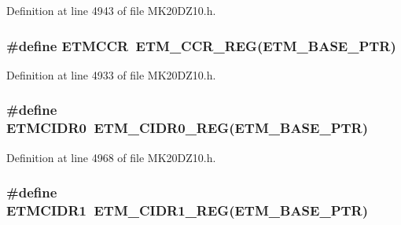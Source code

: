 Definition at line 4943 of file M\+K20\+D\+Z10.\+h.

\subsubsection[{\texorpdfstring{E\+T\+M\+C\+CR}{ETMCCR}}]{\setlength{\rightskip}{0pt plus 5cm}\#define E\+T\+M\+C\+CR~{\bf E\+T\+M\+\_\+\+C\+C\+R\+\_\+\+R\+EG}({\bf E\+T\+M\+\_\+\+B\+A\+S\+E\+\_\+\+P\+TR})}\hypertarget{group___e_t_m___register___accessor___macros_gab02f525097935c0a43de5416b592e375}{}\label{group___e_t_m___register___accessor___macros_gab02f525097935c0a43de5416b592e375}


Definition at line 4933 of file M\+K20\+D\+Z10.\+h.

\subsubsection[{\texorpdfstring{E\+T\+M\+C\+I\+D\+R0}{ETMCIDR0}}]{\setlength{\rightskip}{0pt plus 5cm}\#define E\+T\+M\+C\+I\+D\+R0~{\bf E\+T\+M\+\_\+\+C\+I\+D\+R0\+\_\+\+R\+EG}({\bf E\+T\+M\+\_\+\+B\+A\+S\+E\+\_\+\+P\+TR})}\hypertarget{group___e_t_m___register___accessor___macros_ga2caeb00445e2635d6d9ff0efbdcf3672}{}\label{group___e_t_m___register___accessor___macros_ga2caeb00445e2635d6d9ff0efbdcf3672}


Definition at line 4968 of file M\+K20\+D\+Z10.\+h.

\subsubsection[{\texorpdfstring{E\+T\+M\+C\+I\+D\+R1}{ETMCIDR1}}]{\setlength{\rightskip}{0pt plus 5cm}\#define E\+T\+M\+C\+I\+D\+R1~{\bf E\+T\+M\+\_\+\+C\+I\+D\+R1\+\_\+\+R\+EG}({\bf E\+T\+M\+\_\+\+B\+A\+S\+E\+\_\+\+P\+TR})}\hypertarget{group___e_t_m___register___accessor___macros_ga1efa6f91e4a18f6a03601fcf32115724}{}\label{group___e_t_m___register___accessor___macros_ga1efa6f91e4a18f6a03601fcf32115724}


